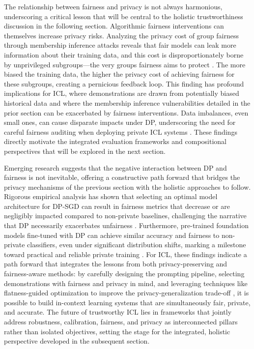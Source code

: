 \documentclass[11pt]{article}
\begin{document}
The relationship between fairness and privacy is not always harmonious, underscoring a critical lesson that will be central to the holistic trustworthiness discussion in the following section. Algorithmic fairness interventions can themselves increase privacy risks. Analyzing the privacy cost of group fairness through membership inference attacks reveals that fair models can leak more information about their training data, and this cost is disproportionately borne by unprivileged subgroups---the very groups fairness aims to protect \cite{ref477}. The more biased the training data, the higher the privacy cost of achieving fairness for these subgroups, creating a pernicious feedback loop. This finding has profound implications for ICL, where demonstrations are drawn from potentially biased historical data and where the membership inference vulnerabilities detailed in the prior section can be exacerbated by fairness interventions. Data imbalances, even small ones, can cause disparate impacts under DP, underscoring the need for careful fairness auditing when deploying private ICL systems \cite{ref478}. These findings directly motivate the integrated evaluation frameworks and compositional perspectives that will be explored in the next section.

Emerging research suggests that the negative interaction between DP and fairness is not inevitable, offering a constructive path forward that bridges the privacy mechanisms of the previous section with the holistic approaches to follow. Rigorous empirical analysis has shown that selecting an optimal model architecture for DP-SGD can result in fairness metrics that decrease or are negligibly impacted compared to non-private baselines, challenging the narrative that DP necessarily exacerbates unfairness \cite{ref479}. Furthermore, pre-trained foundation models fine-tuned with DP can achieve similar accuracy and fairness to non-private classifiers, even under significant distribution shifts, marking a milestone toward practical and reliable private training \cite{ref480}. For ICL, these findings indicate a path forward that integrates the lessons from both privacy-preserving and fairness-aware methods: by carefully designing the prompting pipeline, selecting demonstrations with fairness and privacy in mind, and leveraging techniques like flatness-guided optimization to improve the privacy-generalization trade-off \cite{ref481}, it is possible to build in-context learning systems that are simultaneously fair, private, and accurate. The future of trustworthy ICL lies in frameworks that jointly address robustness, calibration, fairness, and privacy as interconnected pillars rather than isolated objectives, setting the stage for the integrated, holistic perspective developed in the subsequent section.
\end{document}
